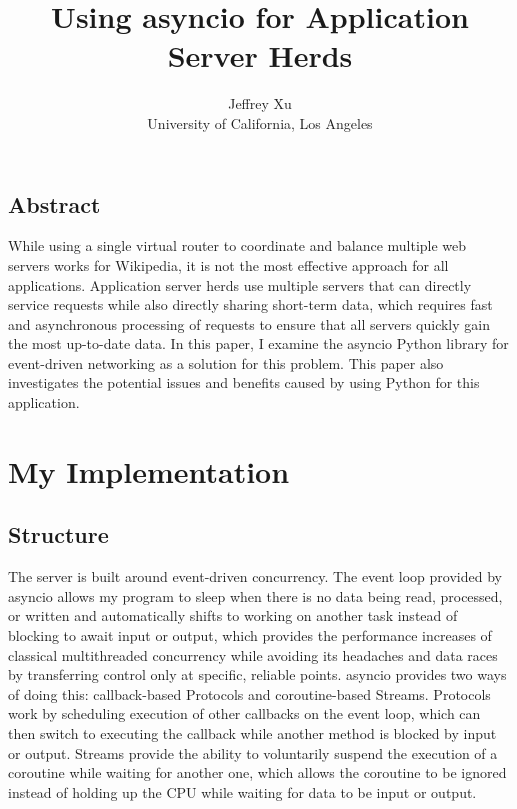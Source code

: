 \documentclass[letterpaper,twocolumn,10pt]{article}
\begin{document}
    
    \date{}
    
    \title{\Large \bf Using asyncio for Application Server Herds}
    
    \author{
    {\rm Jeffrey Xu}\\
    University of California, Los Angeles
    } %
    
    \maketitle
    
    \thispagestyle{empty}
    
    
    \subsection*{Abstract}
    While using a single virtual router to coordinate and balance multiple web servers works for Wikipedia, it is not the most effective approach for all applications.
    Application server herds use multiple servers that can directly service requests while also directly sharing short-term data, which requires fast and asynchronous processing of requests to ensure that all servers quickly gain the most up-to-date data.
    In this paper, I examine the asyncio Python library for event-driven networking as a solution for this problem. This paper also investigates the potential issues and benefits caused by using Python for this application.
    
    \section{My Implementation}
    \subsection{Structure}
    The server is built around event-driven concurrency. The event loop provided by asyncio allows my program to sleep when there is no data being read, processed, or written and automatically shifts to working on another task instead of blocking to await input or output, which provides the performance increases of classical multithreaded concurrency while avoiding its headaches and data races by transferring control only at specific, reliable points. asyncio provides two ways of doing this: callback-based Protocols and coroutine-based Streams. Protocols work by scheduling execution of other callbacks on the event loop, which can then switch to executing the callback while another method is blocked by input or output. Streams provide the ability to voluntarily suspend the execution of a coroutine while waiting for another one, which allows the coroutine to be ignored instead of holding up the CPU while waiting for data to be input or output.\\
\end{document}
